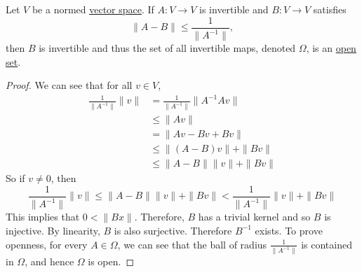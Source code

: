 	\begin{theorem}
	  \label{thm:subset-of-invertible-maps-are-open}
	  Let $V$ be a normed \hyperref[def:vector-space]{vector space}. If $A: V \to V$ is invertible and $B: V \to V$ satisfies
		\begin{equation}
			\|A - B\| \leq \frac{1}{\|A^{-1}\|}, 
		\end{equation}
		then $B$ is invertible and thus the set of all invertible maps, denoted $\Omega$, is an \hyperref[pst-def:open-set]{open set}. 
	\end{theorem}
	\begin{proof}
		We can see that for all $v \in V$, 
		\begin{align}
			\frac{1}{\|A^{-1}\|} \|v\| & = \frac{1}{\|A^{-1}\|} \|A^{-1} A v\| \\ 
																 & \leq \|Av\| \\ 
																 & = \|Av - Bv + Bv\| \\ 
																 & \leq \|(A - B)v\| + \|Bv\| \\ 
																 & \leq \|A - B\| \|v\| + \|Bv\|
		\end{align}
		So if $v \neq 0$, then 
		\begin{equation}
			\frac{1}{\|A^{-1}\|} \|v\| \leq \|A - B\| \|v\| + \|Bv\| < \frac{1}{\|A^{-1}\|} \|v\| + \|Bv\|
		\end{equation}
		This implies that $0 < \|Bx\|$. Therefore, $B$ has a trivial kernel and so $B$ is injective. By linearity, $B$ is also surjective. Therefore $B^{-1}$ exists. To prove openness, for every $A \in \Omega$, we can see that the ball of radius $\frac{1}{\|A^{-1}\|}$ is contained in $\Omega$, and hence $\Omega$ is open. 
	\end{proof}

